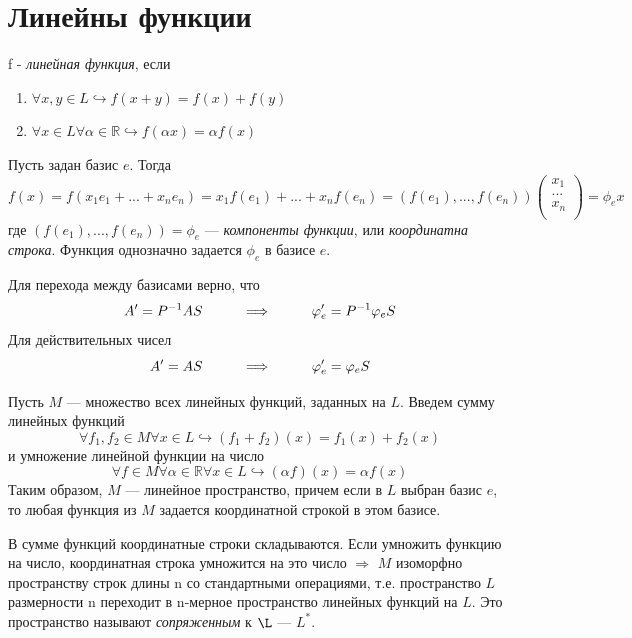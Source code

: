\section{Линейны функции}

\begin{definition}
    f - \textit{линейная функция}, если 
    \begin{enumerate}
        \item $\forall x, y\in L \hookrightarrow f(x + y) = f(x) + f(y)$
        \item $\forall x\in L \forall \alpha \in \mathbb{R} \hookrightarrow f(\alpha x) = \alpha f(x)$
    \end{enumerate}
\end{definition}

\begin{definition}
    Пусть задан базис $e$. Тогда
    \[
    f(x) = f(x_1e_1 + ... + x_ne_n) = x_1f(e_1) + ... + x_nf(e_n) = (f(e_1), ..., f(e_n))\begin{pmatrix}
        x_1\\
        ...\\
        x_n\\
    \end{pmatrix} = \phi_ex
    \]
    где $(f(e_1), ..., f(e_n)) = \phi_e$ --- \textit{компоненты функции}, или \textit{координатна строка}. Функция однозначно задается $\phi_e$ в базисе $e$.
\end{definition}

Для перехода между базисами верно, что
\[
A' = P^{-1}AS \hspace*{1cm} \Longrightarrow \hspace*{1cm} \varphi_e' = P^{-1}\varphi_eS
\]
Для действительных чисел
\[
A' = AS \hspace*{1cm} \Longrightarrow \hspace*{1cm} \varphi_e' = \varphi_eS
\]

Пусть $M$ --- множество всех линейных функций, заданных на $L$. Введем сумму линейных функций
\[
\forall f_1, f_2 \in M \forall x \in L \hookrightarrow (f_1 + f_2)(x) = f_1(x) + f_2(x)
\]
и умножение линейной функции на число
\[
\forall f \in M \forall \alpha \in \mathbb{R} \forall x \in L \hookrightarrow (\alpha f)(x) = \alpha f(x)
\]
Таким образом, $M$ --- линейное пространство, причем если в $L$ выбран базис $e$, то любая функция из $M$ задается координатной строкой в этом базисе.

В сумме функций координатные строки складываются. Если умножить функцию на число, координатная строка умножится на это число $\Longrightarrow$ $M$ изоморфно пространству строк длины n со стандартными операциями, т.е. пространство $L$ размерности n переходит в n-мерное пространство линейных функций на $L$. Это пространство называют \textit{сопряженным} к $\L$ --- $L^*$.

